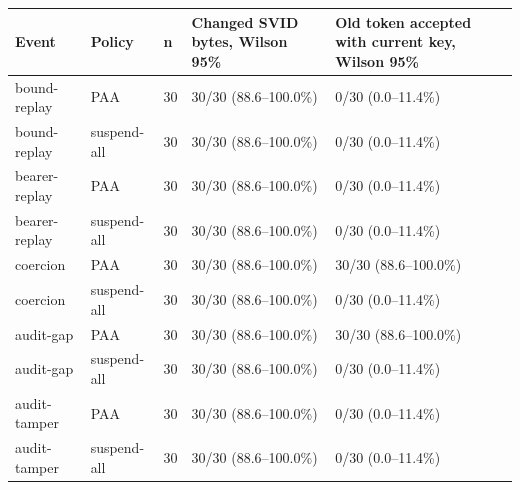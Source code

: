 \begin{tabular}{lllll}
\hline
Event & Policy & n & Changed SVID bytes, Wilson 95\% & Old token accepted with current key, Wilson 95\% \\
\hline
bound-replay & PAA & 30 & 30/30 (88.6--100.0\%) & 0/30 (0.0--11.4\%) \\
bound-replay & suspend-all & 30 & 30/30 (88.6--100.0\%) & 0/30 (0.0--11.4\%) \\
bearer-replay & PAA & 30 & 30/30 (88.6--100.0\%) & 0/30 (0.0--11.4\%) \\
bearer-replay & suspend-all & 30 & 30/30 (88.6--100.0\%) & 0/30 (0.0--11.4\%) \\
coercion & PAA & 30 & 30/30 (88.6--100.0\%) & 30/30 (88.6--100.0\%) \\
coercion & suspend-all & 30 & 30/30 (88.6--100.0\%) & 0/30 (0.0--11.4\%) \\
audit-gap & PAA & 30 & 30/30 (88.6--100.0\%) & 30/30 (88.6--100.0\%) \\
audit-gap & suspend-all & 30 & 30/30 (88.6--100.0\%) & 0/30 (0.0--11.4\%) \\
audit-tamper & PAA & 30 & 30/30 (88.6--100.0\%) & 0/30 (0.0--11.4\%) \\
audit-tamper & suspend-all & 30 & 30/30 (88.6--100.0\%) & 0/30 (0.0--11.4\%) \\
\hline
\end{tabular}
